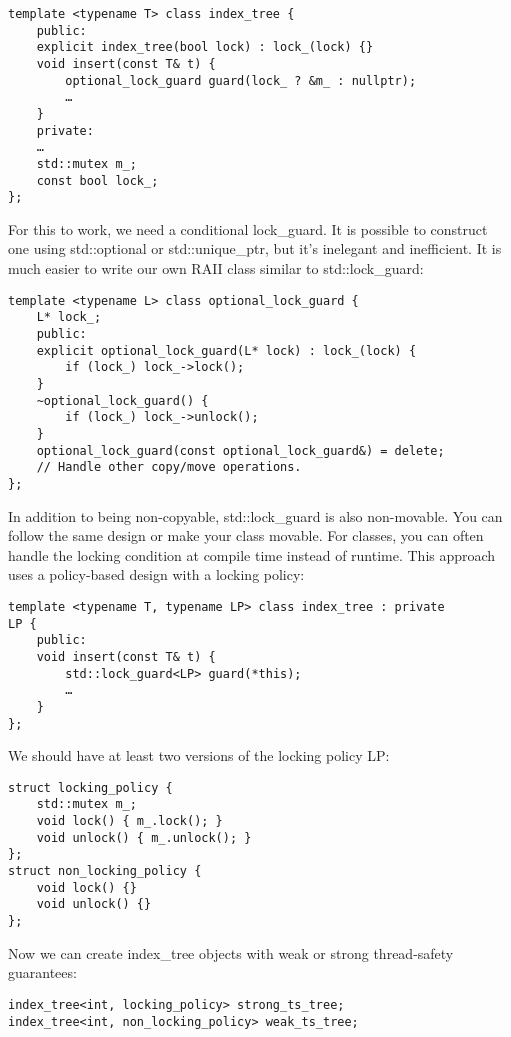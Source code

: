 \begin{lstlisting}[style=styleCXX]
template <typename T> class index_tree {
	public:
	explicit index_tree(bool lock) : lock_(lock) {}
	void insert(const T& t) {
		optional_lock_guard guard(lock_ ? &m_ : nullptr);
		…
	}
	private:
	…
	std::mutex m_;
	const bool lock_;
};
\end{lstlisting}

For this to work, we need a conditional lock\_guard. It is possible to construct one using std::optional or std::unique\_ptr, but it's inelegant and inefficient. It is much easier to write our own RAII class similar to std::lock\_guard:

\begin{lstlisting}[style=styleCXX]
template <typename L> class optional_lock_guard {
	L* lock_;
	public:
	explicit optional_lock_guard(L* lock) : lock_(lock) {
		if (lock_) lock_->lock();
	}
	~optional_lock_guard() {
		if (lock_) lock_->unlock();
	}
	optional_lock_guard(const optional_lock_guard&) = delete;
	// Handle other copy/move operations.
};
\end{lstlisting}

In addition to being non-copyable, std::lock\_guard is also non-movable. You can follow the same design or make your class movable. For classes, you can often handle the locking condition at compile time instead of runtime. This approach uses a policy-based design with a locking policy:

\begin{lstlisting}[style=styleCXX]
template <typename T, typename LP> class index_tree : private 
LP {
	public:
	void insert(const T& t) {
		std::lock_guard<LP> guard(*this);
		…
	}
};
\end{lstlisting}

We should have at least two versions of the locking policy LP:

\begin{lstlisting}[style=styleCXX]
struct locking_policy {
	std::mutex m_;
	void lock() { m_.lock(); }
	void unlock() { m_.unlock(); }
};
struct non_locking_policy {
	void lock() {}
	void unlock() {}
};
\end{lstlisting}

Now we can create index\_tree objects with weak or strong thread-safety guarantees:

\begin{lstlisting}[style=styleCXX]
index_tree<int, locking_policy> strong_ts_tree;
index_tree<int, non_locking_policy> weak_ts_tree;
\end{lstlisting}

